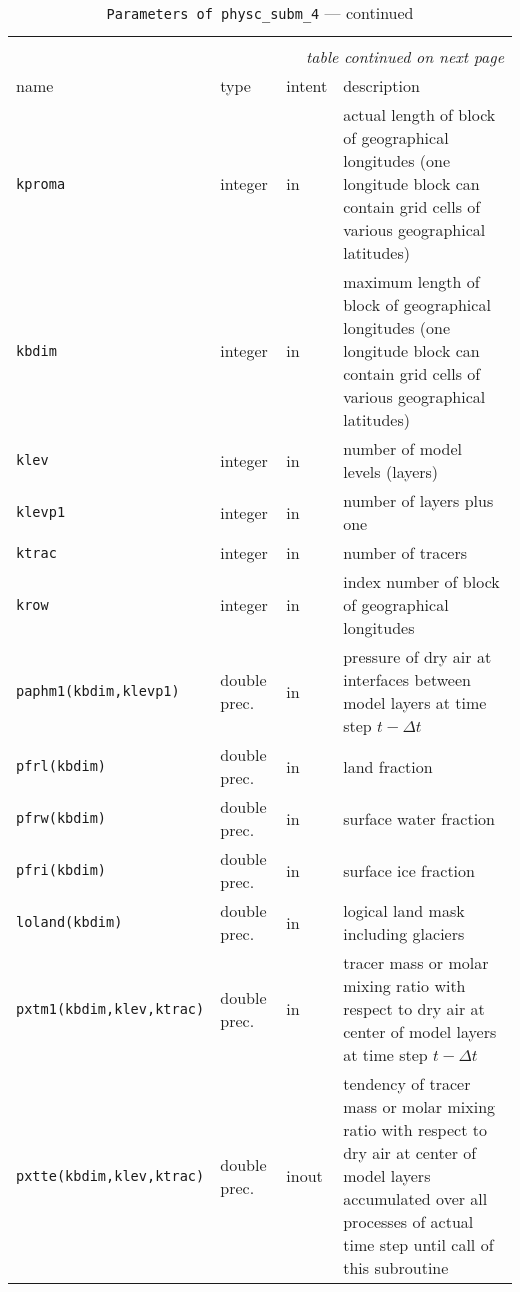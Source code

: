 \begin{longtable}{l@{\extracolsep\fill}llp{7.0cm}}
\hline\hline\caption[Parameters of {\tt physc\_subm\_4}]{Parameter list
  of arguments passed to {\tt
    physc\_subm\_4}}\\\hline\label{tabphysc_subm_4}
\endfirsthead
\caption[]{{\tt Parameters of {\tt physc\_subm\_4}} --- continued}\\\hline
\endhead
\hline\multicolumn{4}{r}{\slshape table continued on next page}\\
\endfoot
\hline %
\endlastfoot
name & type & intent & description \\\hline
{\tt kproma} & integer & in & actual length of
block of geographical longitudes (one longitude block can contain grid
cells of various geographical latitudes)\\
{\tt kbdim} &  integer & in & maximum length of block of
geographical longitudes (one longitude block can contain grid cells of
various geographical latitudes)\\
{\tt klev} &  integer & in & number of model levels (layers)\\
{\tt klevp1} &  integer & in & number of layers plus one \\
{\tt ktrac} &  integer & in & number of tracers \\
{\tt krow} &  integer & in & index number of block of geographical
longitudes\\ 
{\tt paphm1(kbdim,klevp1)} & double prec. & in & pressure of dry air at
interfaces between model layers at time step $t-\Delta t$\\
{\tt pfrl(kbdim)} & double prec. & in & land fraction \\
{\tt pfrw(kbdim)} & double prec. & in & surface water fraction \\
{\tt pfri(kbdim)} & double prec. & in & surface ice fraction \\
{\tt loland(kbdim)} & double prec. & in & logical land mask including
glaciers \\
{\tt pxtm1(kbdim,klev,ktrac)} & double prec. & in & tracer mass or
molar mixing ratio with respect to dry air at center of model layers at
time step $t-\Delta t$\\
{\tt pxtte(kbdim,klev,ktrac)} & double prec. & inout & tendency of tracer
mass or molar mixing ratio with respect to dry air at center of model
layers accumulated over all processes of actual time
step until call of this subroutine \\
\end{longtable}

